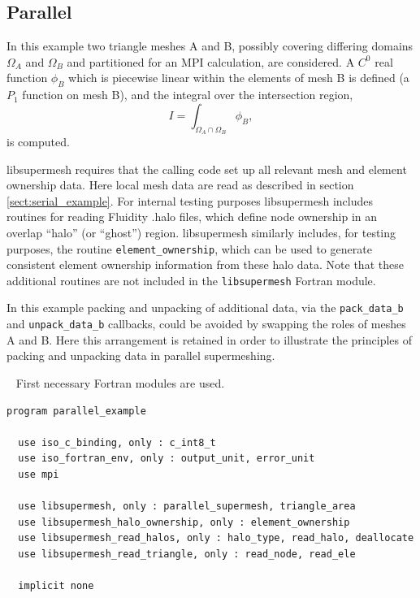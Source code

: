\documentclass{article}
\begin{document}
\subsection{Parallel}

In this example two triangle meshes A and B, possibly covering differing domains
$\Omega_A$ and $\Omega_B$ and partitioned for an MPI calculation, are
considered. A $C^0$ real function $\phi_B$ which is piecewise linear within the
elements of mesh B is defined (a $P_1$ function on mesh B), and the integral
over the intersection region,
\begin{equation*}
  I = \int_{\Omega_A \cap \Omega_B} \phi_B,
\end{equation*}
is computed.

libsupermesh requires that the calling code set up all relevant mesh and element
ownership data. Here local mesh data are read as described in section
\ref{sect:serial_example}. For internal testing purposes libsupermesh includes
routines for reading Fluidity .halo files, which define node ownership in an
overlap ``halo'' (or ``ghost'') region. libsupermesh similarly includes, for
testing purposes, the routine \verb+element_ownership+, which can be used to
generate consistent element ownership information from these halo data. Note
that these additional routines are not included in the \verb+libsupermesh+
Fortran module.

In this example packing and unpacking of additional data, via the
\verb+pack_data_b+ and \linebreak \verb+unpack_data_b+ callbacks, could be
avoided by swapping the roles of meshes A and B. Here this arrangement is
retained in order to illustrate the principles of packing and unpacking data in
parallel supermeshing.

~\newline
First necessary Fortran modules are used.
\begin{lstlisting}[language=FORTRAN]
program parallel_example

  use iso_c_binding, only : c_int8_t
  use iso_fortran_env, only : output_unit, error_unit
  use mpi
  
  use libsupermesh, only : parallel_supermesh, triangle_area
  use libsupermesh_halo_ownership, only : element_ownership
  use libsupermesh_read_halos, only : halo_type, read_halo, deallocate
  use libsupermesh_read_triangle, only : read_node, read_ele

  implicit none
\end{lstlisting}
\end{document}
